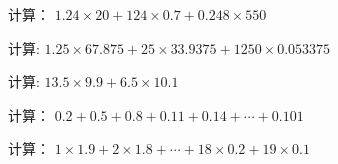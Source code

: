 \begin{example}
计算：
	$1.24 \times 20+124 \times 0.7+0.248 \times 550$
	
	
	\begin{Ssol}
		\vspace{\solfourproblems}
	\end{Ssol}
\end{example}


\begin{example}
计算: $1.25 \times 67.875+25 \times 33.9375+1250 \times 0.053375$
	
	
	
	\begin{Ssol}
		\vspace{\solfourproblems}
	\end{Ssol}
\end{example}

\begin{example}
	\begin{problems}
		计算: $13.5 \times 9.9+6.5 \times 10.1$
	\end{problems} 
	
	\begin{Ssol}
		\vspace{\solthreeproblems}
	\end{Ssol}
\end{example}





\begin{example}
	计算： $0.2+0.5+0.8+0.11+0.14+\cdots+0.101$	
	
	\begin{Ssol}
		\vspace{\solfourproblems}
	\end{Ssol}
\end{example}


\begin{example}
计算：	$1 \times 1.9+2 \times 1.8+\cdots+18\times 0.2+19 \times 0.1$
	
	\begin{Ssol}
		\vspace{\solfourproblems}
	\end{Ssol}
\end{example}


